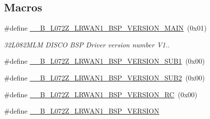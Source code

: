 \subsection*{Macros}
\begin{DoxyCompactItemize}
\item 
\#define \hyperlink{group__B-L072Z-LRWAN1__LOW__LEVEL__Private__Defines_gaf5f53a499afef1aaa3850de7086a11a5}{\+\_\+\+\_\+\+B\+\_\+\+L072\+Z\+\_\+\+L\+R\+W\+A\+N1\+\_\+\+B\+S\+P\+\_\+\+V\+E\+R\+S\+I\+O\+N\+\_\+\+M\+A\+IN}~(0x01)
\begin{DoxyCompactList}\small\item\em 32\+L082\+M\+LM D\+I\+S\+CO B\+SP Driver version number V1.. \end{DoxyCompactList}\item 
\#define \hyperlink{group__B-L072Z-LRWAN1__LOW__LEVEL__Private__Defines_ga682147e46afbdf8d1002615e3ff7ad4a}{\+\_\+\+\_\+\+B\+\_\+\+L072\+Z\+\_\+\+L\+R\+W\+A\+N1\+\_\+\+B\+S\+P\+\_\+\+V\+E\+R\+S\+I\+O\+N\+\_\+\+S\+U\+B1}~(0x00)
\item 
\#define \hyperlink{group__B-L072Z-LRWAN1__LOW__LEVEL__Private__Defines_gaf0b4c3a1aa8fd40d74fc5fe1c845059e}{\+\_\+\+\_\+\+B\+\_\+\+L072\+Z\+\_\+\+L\+R\+W\+A\+N1\+\_\+\+B\+S\+P\+\_\+\+V\+E\+R\+S\+I\+O\+N\+\_\+\+S\+U\+B2}~(0x00)
\item 
\#define \hyperlink{group__B-L072Z-LRWAN1__LOW__LEVEL__Private__Defines_ga1c5543dd393ec382e3cee4c35b86c9cd}{\+\_\+\+\_\+\+B\+\_\+\+L072\+Z\+\_\+\+L\+R\+W\+A\+N1\+\_\+\+B\+S\+P\+\_\+\+V\+E\+R\+S\+I\+O\+N\+\_\+\+RC}~(0x00)
\item 
\#define \hyperlink{group__B-L072Z-LRWAN1__LOW__LEVEL__Private__Defines_ga62f40f0f53b1c1d1f0aaaa7fb0b63d5f}{\+\_\+\+\_\+\+B\+\_\+\+L072\+Z\+\_\+\+L\+R\+W\+A\+N1\+\_\+\+B\+S\+P\+\_\+\+V\+E\+R\+S\+I\+ON}
\end{DoxyCompactItemize}
